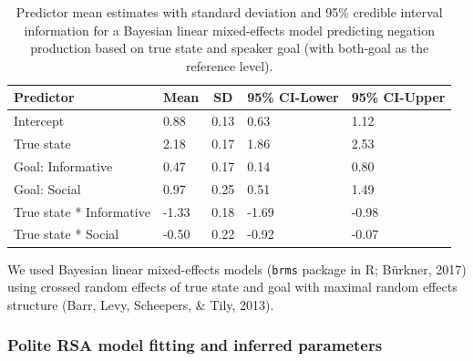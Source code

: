 \documentclass[12pt]{article}
\begin{document}
\begin{table}[tbp]
\begin{center}
\begin{threeparttable}
\caption{\label{tab:brmTab}Predictor mean estimates with standard deviation and 95\% credible interval information for a Bayesian linear mixed-effects model predicting negation production based on true state and speaker goal (with both-goal as the reference level).}
\begin{tabular}{lllll}
\toprule
Predictor & \multicolumn{1}{c}{Mean} & \multicolumn{1}{c}{SD} & \multicolumn{1}{c}{95\% CI-Lower} & \multicolumn{1}{c}{95\% CI-Upper}\\
\midrule
Intercept & 0.88 & 0.13 & 0.63 & 1.12\\
True state & 2.18 & 0.17 & 1.86 & 2.53\\
Goal: Informative & 0.47 & 0.17 & 0.14 & 0.80\\
Goal: Social & 0.97 & 0.25 & 0.51 & 1.49\\
True state * Informative & -1.33 & 0.18 & -1.69 & -0.98\\
True state * Social & -0.50 & 0.22 & -0.92 & -0.07\\
\bottomrule
\end{tabular}
\end{threeparttable}
\end{center}
\end{table}

We used Bayesian linear mixed-effects models (\texttt{brms} package in
R; Bürkner, 2017) using crossed random effects of true state and goal
with maximal random effects structure (Barr, Levy, Scheepers, \& Tily,
2013).

\subsubsection*{Polite RSA model fitting and inferred
parameters}\label{polite-rsa-model-fitting-and-inferred-parameters}
\end{document}
